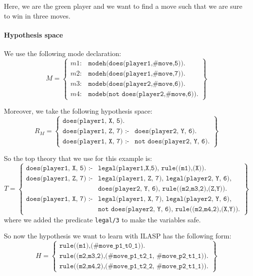 \documentclass[12pt,twoside]{report}
\begin{document}
Here, we are the green player and we want to find a move such that we are sure to win in three moves.

\paragraph{Hypothesis space}

We use the following mode declaration:
\[ M=
\begin{Bmatrix} 
m1 :& \texttt{modeh(does(player1,\#move,5)).} \\ 
m2 :& \texttt{modeh(does(player1,\#move,7)).}\\
m3 :& \texttt{modeb(does(player2,\#move,6)).}\\
m4 :& \texttt{modeb(not does(player2,\#move,6)).}
\end{Bmatrix}
\]

Moreover, we take the following hypothesis space:
\[ R_M=
\begin{Bmatrix}
\texttt{does(player1, X, 5).} \\ 
\texttt{does(player1, Z, 7) :-} & \texttt{does(player2, Y, 6).}\\
\texttt{does(player1, X, 7) :-}  & \texttt{not does(player2, Y, 6).}
\end{Bmatrix}
\]

So the top theory that we use for this example is:
\[ T=
\begin{Bmatrix}
\texttt{does(player1, X, 5) :-} & \texttt{legal(player1,X,5), rule((m1),(X)).} \\ 

\texttt{does(player1, Z, 7) :-} & \texttt{legal(player1, Z, 7), legal(player2, Y, 6), }\\ 
 & \texttt{does(player2, Y, 6), rule((m2,m3,2),(Z,Y)).} \\

\texttt{does(player1, X, 7) :-} & \texttt{legal(player1, X, 7), legal(player2, Y, 6), } \\
& \texttt{not does(player2, Y, 6), rule((m2,m4,2),(X,Y)).}
\end{Bmatrix}
\]
where we added the predicate \texttt{legal/3} to make the variables safe.

\bigskip

So now the hypothesis we want to learn with ILASP has the following form:
\[H=
\begin{Bmatrix}
\texttt{rule((m1),(\#move\_p1\_t0\_1)).}\\
\texttt{rule((m2,m3,2),(\#move\_p1\_t2\_1, \#move\_p2\_t1\_1))}.\\
\texttt{rule((m2,m4,2),(\#move\_p1\_t2\_2, \#move\_p2\_t1\_1))}.
\end{Bmatrix}
\]
\end{document}
